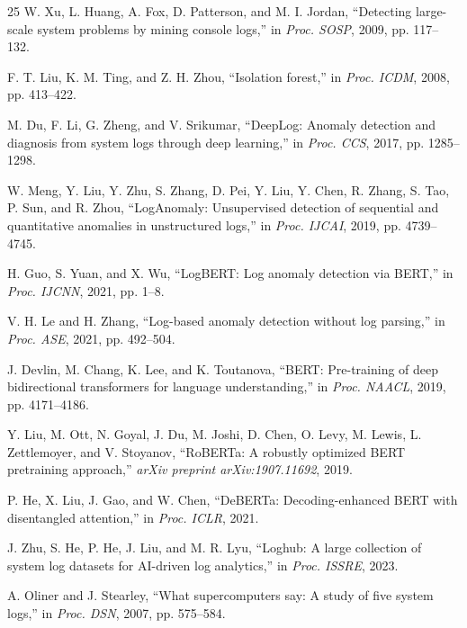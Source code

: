 \documentclass[conference]{IEEEtran}
\begin{document}
\begin{thebibliography}{25}
W. Xu, L. Huang, A. Fox, D. Patterson, and M. I. Jordan, ``Detecting large-scale system problems by mining console logs,'' in \textit{Proc. SOSP}, 2009, pp. 117--132.

F. T. Liu, K. M. Ting, and Z. H. Zhou, ``Isolation forest,'' in \textit{Proc. ICDM}, 2008, pp. 413--422.

M. Du, F. Li, G. Zheng, and V. Srikumar, ``DeepLog: Anomaly detection and diagnosis from system logs through deep learning,'' in \textit{Proc. CCS}, 2017, pp. 1285--1298.

W. Meng, Y. Liu, Y. Zhu, S. Zhang, D. Pei, Y. Liu, Y. Chen, R. Zhang, S. Tao, P. Sun, and R. Zhou, ``LogAnomaly: Unsupervised detection of sequential and quantitative anomalies in unstructured logs,'' in \textit{Proc. IJCAI}, 2019, pp. 4739--4745.

H. Guo, S. Yuan, and X. Wu, ``LogBERT: Log anomaly detection via BERT,'' in \textit{Proc. IJCNN}, 2021, pp. 1--8.

V. H. Le and H. Zhang, ``Log-based anomaly detection without log parsing,'' in \textit{Proc. ASE}, 2021, pp. 492--504.

J. Devlin, M. Chang, K. Lee, and K. Toutanova, ``BERT: Pre-training of deep bidirectional transformers for language understanding,'' in \textit{Proc. NAACL}, 2019, pp. 4171--4186.

Y. Liu, M. Ott, N. Goyal, J. Du, M. Joshi, D. Chen, O. Levy, M. Lewis, L. Zettlemoyer, and V. Stoyanov, ``RoBERTa: A robustly optimized BERT pretraining approach,'' \textit{arXiv preprint arXiv:1907.11692}, 2019.

P. He, X. Liu, J. Gao, and W. Chen, ``DeBERTa: Decoding-enhanced BERT with disentangled attention,'' in \textit{Proc. ICLR}, 2021.

J. Zhu, S. He, P. He, J. Liu, and M. R. Lyu, ``Loghub: A large collection of system log datasets for AI-driven log analytics,'' in \textit{Proc. ISSRE}, 2023.

A. Oliner and J. Stearley, ``What supercomputers say: A study of five system logs,'' in \textit{Proc. DSN}, 2007, pp. 575--584.

\end{thebibliography}
\end{document}
